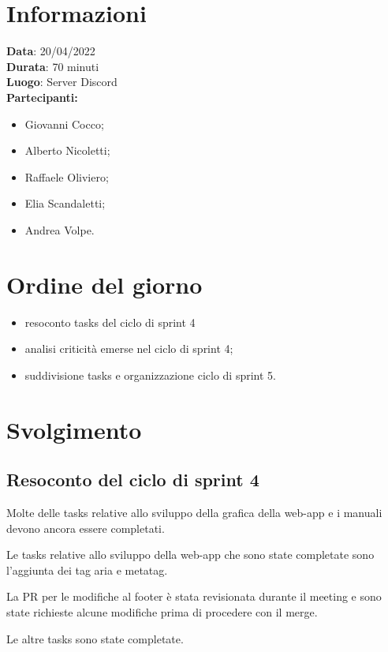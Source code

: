 \documentclass[a4paper, 12pt]{article}
\begin{document}
\makefrontpage

\section{Informazioni}
\textbf{Data}: 20/04/2022\\
\textbf{Durata}: 70 minuti\\
\textbf{Luogo}: Server Discord\\

\textbf{Partecipanti:}
\begin{itemize}
	\item Giovanni Cocco;
	\item Alberto Nicoletti;
	\item Raffaele Oliviero;
	\item Elia Scandaletti;
	\item Andrea Volpe.
\end{itemize}


\section{Ordine del giorno}
\begin{itemize}
	\item resoconto tasks del ciclo di sprint 4
	\item analisi criticità emerse nel ciclo di sprint 4;
	\item suddivisione tasks e organizzazione ciclo di sprint 5.
\end{itemize}

\section{Svolgimento}

\subsection{Resoconto del ciclo di sprint 4}
Molte delle tasks relative allo sviluppo della grafica della web-app e i manuali devono ancora essere completati.

Le tasks relative allo sviluppo della web-app che sono state completate sono l'aggiunta dei tag aria e metatag.

La PR per le modifiche al footer è stata revisionata durante il meeting e sono state richieste alcune modifiche prima di procedere con il merge.

Le altre tasks sono state completate.
\end{document}
